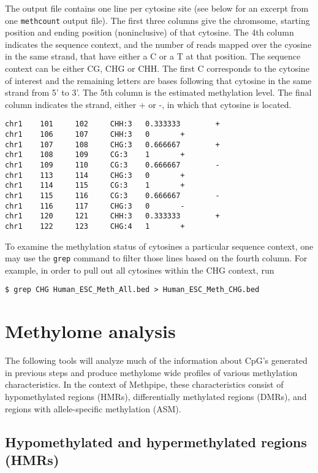 \documentclass[10pt]{article}
\newcommand{\prog}[1]{\texttt{#1}}
\begin{document}
The output file contains one line per cytosine site (see below for an
excerpt from one \prog{methcount} output file). The first three
columns give the chromsome, starting position and ending position
(noninclusive) of that cytosine. The 4th column indicates the sequence
context, and the number of reads mapped over the cyosine in the same
strand, that have either a C or a T at that position. The sequence
context can be either CG, CHG or CHH. The first C corresponds to the
cytosine of interest and the remaining letters are bases following
that cytosine in the same strand from 5' to 3'. The 5th column is the
estimated methylation level. The final column indicates the strand, either +
or -, in which that cytosine is located.  {\small{%
\begin{verbatim}
chr1    101     102     CHH:3   0.333333        +
chr1    106     107     CHH:3   0       +
chr1    107     108     CHG:3   0.666667        +
chr1    108     109     CG:3    1       +
chr1    109     110     CG:3    0.666667        -
chr1    113     114     CHG:3   0       +
chr1    114     115     CG:3    1       +
chr1    115     116     CG:3    0.666667        -
chr1    116     117     CHG:3   0       -
chr1    120     121     CHH:3   0.333333        +
chr1    122     123     CHG:4   1       +
\end{verbatim}%
}}

To examine the methylation status of cytosines a particular sequence
context, one may use the \prog{grep} command to filter those lines
based on the fourth column. For example, in order to pull out all
cytosines within the CHG context, run
\begin{verbatim}
$ grep CHG Human_ESC_Meth_All.bed > Human_ESC_Meth_CHG.bed
\end{verbatim}

\section{Methylome analysis}
\label{sec:high-level-analys}

The following tools will analyze much of the information about CpG's
generated in previous steps and produce methylome wide profiles of
various methylation characteristics. In the context of Methpipe, these
characteristics consist of hypomethylated regions (HMRs),
differentially methylated regions (DMRs), and regions with
allele-specific methylation (ASM).

\subsection{Hypomethylated and hypermethylated regions (HMRs)}
\label{sec:ident-hypo-methyl}
\end{document}
